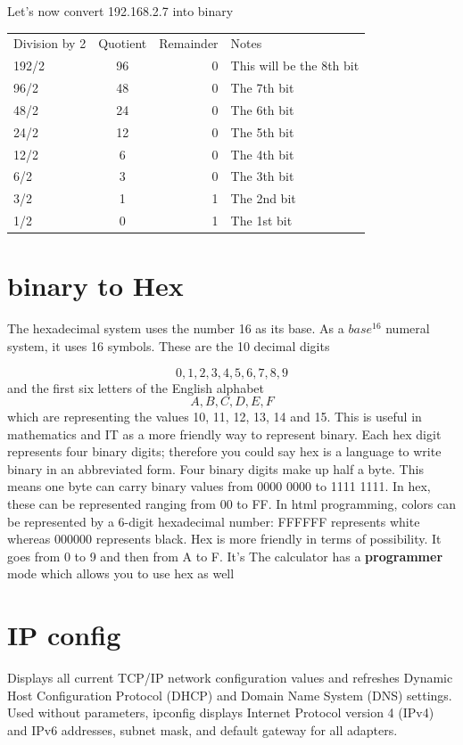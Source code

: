 \documentclass[a4paper,12pt]{book}
\begin{document}
Let's now convert 192.168.2.7 into binary
\newline

\begin{tabular}{||l|c|r|p{5cm}||}
    Division by 2 & Quotient & Remainder & Notes \\
    192/2 & 96 & 0 & This will be the 8th bit \\
    96/2 & 48 & 0 & The 7th bit \\
    48/2 & 24 & 0 & The 6th bit \\
    24/2 & 12 & 0 & The 5th bit \\
    12/2 & 6 & 0 & The 4th bit \\
    6/2 & 3 & 0 & The 3th bit \\
    3/2 & 1 & 1 & The 2nd bit \\
    1/2 & 0 & 1 & The 1st bit \\
\end{tabular}

\section{binary to Hex}

The hexadecimal system uses the number 16 as its base. As a $base^{16}$ numeral system, it uses 16 symbols. These are the 10 decimal digits 

\[0, 1, 2, 3, 4, 5, 6, 7, 8, 9\] and the first six letters of the English alphabet \[A, B, C, D, E, F\] which are representing the values 10, 11, 12, 13, 14 and 15.
This is useful in mathematics and IT as a more friendly way to represent binary. Each hex digit represents four binary digits; therefore you could say hex is a language to write binary in an abbreviated form.
Four binary digits make up half a byte. This means one byte can carry binary values from 0000 0000 to 1111 1111. In hex, these can be represented ranging from 00 to FF.
In html programming, colors can be represented by a 6-digit hexadecimal number: FFFFFF represents white whereas 000000 represents black.
Hex is more friendly in terms of possibility. It goes from 0 to 9 and then from A to F. It's 
The calculator has a \textbf{programmer} mode which allows you to use hex as well

\section{IP config}
Displays all current TCP/IP network configuration values and refreshes Dynamic Host Configuration Protocol (DHCP) and Domain Name System (DNS) settings. Used without parameters, ipconfig displays Internet Protocol version 4 (IPv4) and IPv6 addresses, subnet mask, and default gateway for all adapters.
\end{document}
